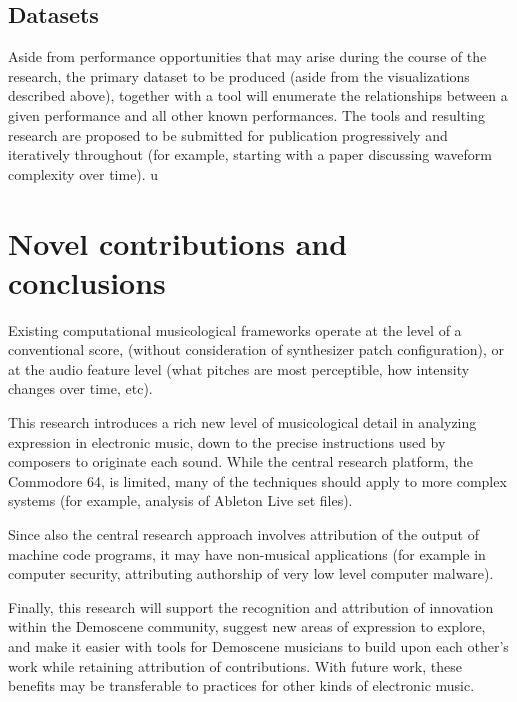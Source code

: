 \documentclass[10pt]{article}
\begin{document}
\begin{multicols*}{2}
  \subsection{Datasets}

Aside from performance opportunities that may arise during the course of the research, the primary dataset to be produced (aside from the visualizations described above), together with a tool will enumerate the relationships between a given performance and all other known performances.	The tools and resulting research are proposed to be submitted for publication progressively and iteratively throughout (for example, starting with a paper discussing waveform complexity over time). u

\section{Novel contributions and conclusions}

Existing computational musicological frameworks operate at the level of a conventional score, (without consideration of synthesizer patch configuration), or at the audio feature level (what pitches are most perceptible, how intensity changes over time, etc).

This research introduces a rich new level of musicological detail in analyzing expression in electronic music, down to the precise instructions used by composers to originate each sound. While the central research platform, the Commodore 64, is limited, many of the techniques should apply to more complex systems (for example, analysis of Ableton Live set files).

Since also the central research approach involves attribution of the output of machine code programs, it may have non-musical applications (for example in computer security, attributing authorship of very low level computer malware).

Finally, this research will support the recognition and attribution of innovation within the Demoscene community, suggest new areas of expression to explore, and make it easier with tools for Demoscene musicians to build upon each other’s work while retaining attribution of contributions. With future work, these benefits may be transferable to practices for other kinds of electronic music.


\clearpage


\end{multicols*}

\nocite{*}


\end{document}
